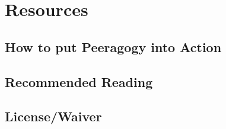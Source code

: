 \documentclass[ebook,12pt, twoside]{memoir}
\let\sc\scshape
\let\sc\scshape
\begin{document}
\part{Resources} \label{resources-part} %
%
%
\chapter[\textbf{How to put Peeragogy into Action}]{How to put Peeragogy into Action}
%

%
%
%
\chapter[\textbf{Recommended Reading}]{Recommended Reading}
%

%
%
%
%
%
%



\newpage
\chapter[\textbf{License/Waiver}]{License/Waiver} \label{license-chapter}

%
\pagestyle{empty} \thispagestyle{empty}
\clearpage\mbox{}\clearpage\mbox{}\clearpage    %
\end{document}
